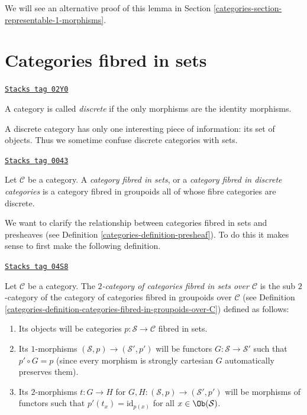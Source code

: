 We will see an alternative proof of this lemma in
Section \ref{categories-section-representable-1-morphisms}.

\section{Categories fibred in sets}
\label{categories-section-fibred-in-sets}
\begin{definition}[Discrete]
\label{categories-definition-discrete}
\href{https://stacks.math.columbia.edu/tag/02Y0}{\texttt{Stacks tag 02Y0}}

A category is called {\it discrete} if the only morphisms are the identity
morphisms.
\end{definition}

A discrete category has only one interesting piece of information:
its set of objects. Thus we sometime confuse discrete categories
with sets.

\begin{definition}
\label{categories-definition-category-fibred-sets}
\href{https://stacks.math.columbia.edu/tag/0043}{\texttt{Stacks tag 0043}}

Let $\mathcal{C}$ be a category.
A {\it category fibred in sets}, or a {\it category fibred
in discrete categories} is a category fibred in groupoids all
of whose fibre categories are discrete.
\end{definition}

We want to clarify the relationship between categories fibred in sets
and presheaves (see Definition \ref{categories-definition-presheaf}).
To do this it makes sense to first make the following definition.

\begin{definition}
\label{categories-definition-categories-fibred-in-sets-over-C}
\href{https://stacks.math.columbia.edu/tag/04S8}{\texttt{Stacks tag 04S8}}

Let $\mathcal{C}$ be a category.
The {\it $2$-category of categories fibred in sets over $\mathcal{C}$}
is the sub $2$-category of the category of categories fibred in groupoids
over $\mathcal{C}$ (see
Definition \ref{categories-definition-categories-fibred-in-groupoids-over-C})
defined as follows:
\begin{enumerate}
\item Its objects will be categories
$p : \mathcal{S} \to \mathcal{C}$ fibred in sets.
\item Its $1$-morphisms $(\mathcal{S}, p) \to (\mathcal{S}', p')$
will be functors $G : \mathcal{S} \to \mathcal{S}'$ such that
$p' \circ G = p$ (since every morphism is strongly cartesian
$G$ automatically preserves them).
\item Its $2$-morphisms $t : G \to H$ for
$G, H : (\mathcal{S}, p) \to (\mathcal{S}', p')$
will be morphisms of functors
such that $p'(t_x) = \text{id}_{p(x)}$
for all $x \in \Ob(\mathcal{S})$.
\end{enumerate}
\end{definition}

